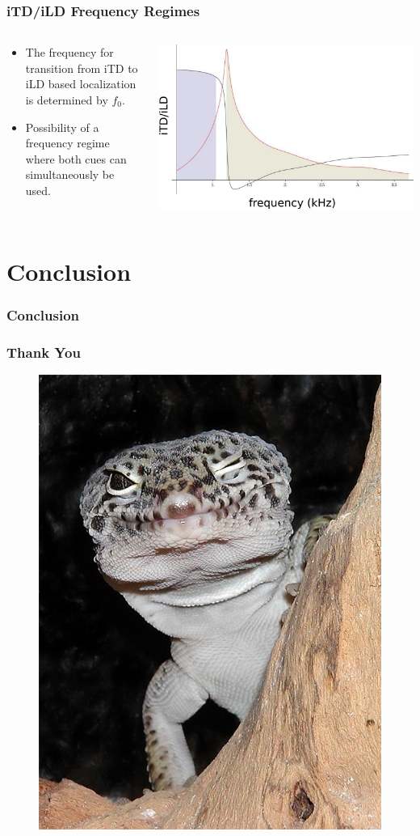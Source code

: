 \documentclass{beamer}
\begin{document}
\begin{frame}
\frametitle{iTD/iLD Frequency Regimes}
\begin{columns}
\begin{column}{0.5\textwidth}
\begin{exampleblock}{}
\small
 \begin{itemize}
  \item The frequency for transition from iTD to iLD based localization is determined by $f_0$.
  \item Possibility of a frequency regime where both cues can simultaneously be used.
 \end{itemize}
\end{exampleblock}
\end{column}
     \begin{column}{0.5\textwidth}
      \includegraphics[width = 6 cm]{Diagrams/Presentation/tokayregions.png}
\end{column}
\end{columns}
\end{frame}

\section{Conclusion}
\begin{frame}[t]
 \frametitle{Conclusion}
\end{frame}

\begin{frame}[t]
 \frametitle{Thank You}
 \begin{figure}
  \centering
  \includegraphics[width=.3\textwidth]{Diagrams/geckowink.jpg}
 \end{figure}
\end{frame}
\end{document}
